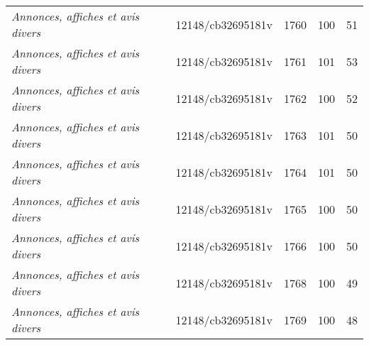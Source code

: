 \begin{table}[ht]
{\begin{tabular}{lcccc}
			\textit{Annonces, affiches et avis divers}                               & 12148/cb32695181v                             & 1760                                & 100                                               & 51                                              \\ 
			\textit{Annonces, affiches et avis divers}                               & 12148/cb32695181v                             & 1761                                & 101                                               & 53                                              \\ 
			\textit{Annonces, affiches et avis divers}                               & 12148/cb32695181v                             & 1762                                & 100                                               & 52                                              \\ 
			\textit{Annonces, affiches et avis divers}                               & 12148/cb32695181v                             & 1763                                & 101                                               & 50                                              \\ 
			\textit{Annonces, affiches et avis divers}                               & 12148/cb32695181v                             & 1764                                & 101                                               & 50                                              \\ 
			\textit{Annonces, affiches et avis divers}                               & 12148/cb32695181v                             & 1765                                & 100                                               & 50                                              \\ 
			\textit{Annonces, affiches et avis divers}                               & 12148/cb32695181v                             & 1766                                & 100                                               & 50                                              \\ 
			\textit{Annonces, affiches et avis divers}                               & 12148/cb32695181v                             & 1768                                & 100                                               & 49                                              \\ 
			\textit{Annonces, affiches et avis divers}                               & 12148/cb32695181v                             & 1769                                & 100                                               & 48                                              \\ 

\end{tabular}}
\end{table}
